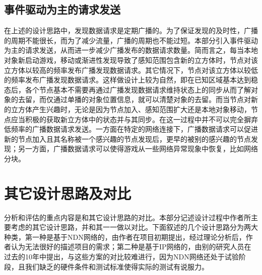 \subsection{事件驱动为主的请求发送}
\par
在上述的设计思路中，发现数据请求是定期广播的。为了保证发现的及时性，广播的周期不能很长，而为了减少流量，广播的周期也不能过短。本部分引入事件驱动为主的请求发送，从而进一步减少广播发布的数据请求数量。简而言之，每当本地对象新启动游戏，移动或渐进性发现导致了感知范围包含新的立方体时，节点对该立方体以较高的频率发布广播发现数据请求。其它情况下，节点对该立方体以较低的频率发布广播发现数据请求。这样做设计上较为自然，即在已知区域基本达到稳态后，各个节点基本不需要再通过广播发现数据请求维持状态上的同步从而了解对象的去留，而仅通过单播的对象位置信息，就可以清楚对象的去留。而当节点对新的立方体产生兴趣时，无论是因为节点加入、感知范围扩大还是本地对象移动，节点应当积极的获取新立方体中的状态并与其同步。在这一过程中并不可以完全摒弃低频率的广播数据请求发送。一方面在特定的网络连接下，广播数据请求可以促进新的节点加入且其名称被一个感兴趣的节点发现后，更早的被别的感兴趣的节点发现；另一方面，广播数据请求可以使得游戏从一些网络异常现象中恢复，比如网络分块。
\section{其它设计思路及对比}
\label{ComparisonSection}
\par
分析和评估的重点内容是和其它设计思路的对比。本部分记述设计过程中作者所主要考虑的其它设计思路，并和其一一做以对比。下面叙述的几个设计思路分为两大种类，第一种是基于NDN网络的，由作者在项目初期提出，经过理论分析后，作者认为无法很好的描述项目的需求；第二种是基于IP网络的，由别的研究人员在过去的10年中提出，与这些方案的对比较难进行，因为NDN网络还处于试验阶段，且我们缺乏的硬件条件和测试标准使得实际的测试有说服力。
